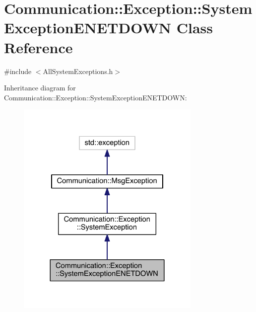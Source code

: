 \hypertarget{class_communication_1_1_exception_1_1_system_exception_e_n_e_t_d_o_w_n}{}\section{Communication\+:\+:Exception\+:\+:System\+Exception\+E\+N\+E\+T\+D\+O\+W\+N Class Reference}
\label{class_communication_1_1_exception_1_1_system_exception_e_n_e_t_d_o_w_n}


{\ttfamily \#include $<$All\+System\+Exceptions.\+h$>$}



Inheritance diagram for Communication\+:\+:Exception\+:\+:System\+Exception\+E\+N\+E\+T\+D\+O\+W\+N\+:\nopagebreak
\begin{figure}[H]
\begin{center}
\leavevmode
\includegraphics[width=252pt]{class_communication_1_1_exception_1_1_system_exception_e_n_e_t_d_o_w_n__inherit__graph}
\end{center}
\end{figure}


